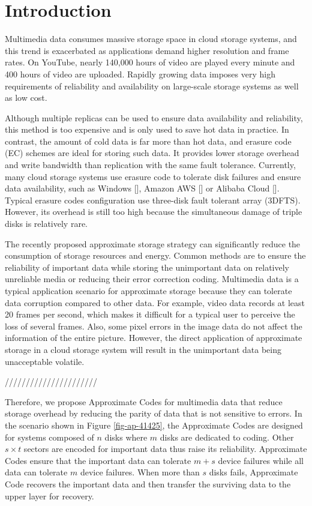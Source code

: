 \documentclass[sigconf]{acmart}
\begin{document}
\maketitle

\section{Introduction}
Multimedia data consumes massive storage space in cloud storage systems, and this trend is exacerbated as applications demand higher resolution and frame rates. On YouTube, nearly 140,000 hours of video are played every minute and 400 hours of video are uploaded. Rapidly growing data imposes very high requirements of reliability and availability on large-scale storage systems as well as low cost.

Although multiple replicas can be used to ensure data availability and reliability, this method is too expensive and is only used to save hot data in practice. In contrast, the amount of cold data is far more than hot data, and erasure code (EC) schemes are ideal for storing such data. It provides lower storage overhead and write bandwidth than replication with the same fault tolerance. Currently, many cloud storage systems use erasure code to tolerate disk failures and ensure data availability, such as Windows [], Amazon AWS [] or Alibaba Cloud []. Typical erasure codes configuration use three-disk fault tolerant array (3DFTS). However, its overhead is still too high because the simultaneous damage of triple disks is relatively rare. 

The recently proposed approximate storage strategy can significantly reduce the consumption of storage resources and energy. Common methods are to ensure the reliability of important data while storing the unimportant data on relatively unreliable media or reducing their error correction coding. Multimedia data is a typical application scenario for approximate storage because they can tolerate data corruption compared to other data. For example, video data records at least 20 frames per second, which makes it difficult for a typical user to perceive the loss of several frames. Also, some pixel errors in the image data do not affect the information of the entire picture. However, the direct application of approximate storage in a cloud storage system will result in the unimportant data being unacceptable volatile.

//////////////////////

Therefore, we propose Approximate Codes for multimedia data that reduce storage overhead by reducing the parity of data that is not sensitive to errors. In the scenario shown in Figure \ref{fig-ap-41425}, the Approximate Codes are designed for systems composed of $n$ disks where $m$ disks are dedicated to coding.
Other $s \times t$ sectors are encoded for important data thus raise its reliability. Approximate Codes ensure that the important data can tolerate $m+s$ device failures while all data can tolerate $m$ device failures.
When more than $s$ disks fails, Approximate Code recovers the important data and then transfer the surviving data to the upper layer for recovery. 
\end{document}
